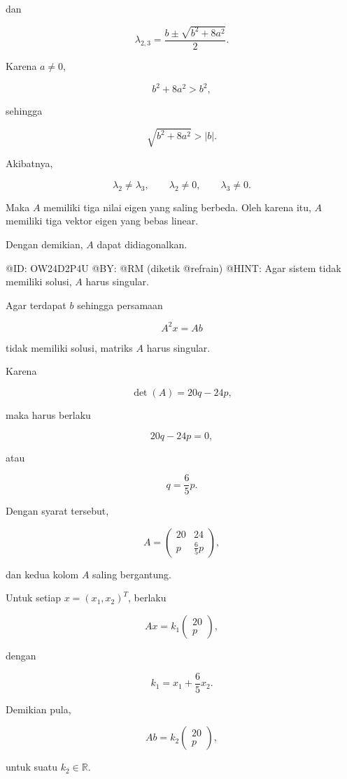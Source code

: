 dan

$$
\lambda_{2,3}
=
\frac{b\pm\sqrt{b^2+8a^2}}2.
$$

Karena $a\ne0$,

$$
b^2+8a^2>b^2,
$$

sehingga

$$
\sqrt{b^2+8a^2}>|b|.
$$

Akibatnya,

$$
\lambda_2\ne\lambda_3,
\qquad
\lambda_2\ne0,
\qquad
\lambda_3\ne0.
$$

Maka $A$ memiliki tiga nilai eigen yang saling berbeda. Oleh karena itu, $A$ memiliki tiga vektor eigen yang bebas linear.

Dengan demikian, $A$ dapat didiagonalkan.

@ID: OW24D2P4U
@BY: @RM (diketik @refrain)
@HINT: Agar sistem tidak memiliki solusi, $A$ harus singular.

Agar terdapat $b$ sehingga persamaan

$$
A^2x=Ab
$$

tidak memiliki solusi, matriks $A$ harus singular.

Karena

$$
\det(A)=20q-24p,
$$

maka harus berlaku

$$
20q-24p=0,
$$

atau

$$
q=\frac65p.
$$

Dengan syarat tersebut,

$$
A=
\begin{pmatrix}
20&24\\
p&\frac65p
\end{pmatrix},
$$

dan kedua kolom $A$ saling bergantung.

Untuk setiap $x=(x_1,x_2)^T$, berlaku

$$
Ax
=
k_1
\begin{pmatrix}
20\\
p
\end{pmatrix},
$$

dengan

$$
k_1=x_1+\frac65x_2.
$$

Demikian pula,

$$
Ab
=
k_2
\begin{pmatrix}
20\\
p
\end{pmatrix},
$$

untuk suatu $k_2\in\mathbb R$.

